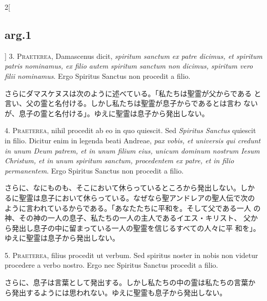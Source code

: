 \documentclass[paper=a4paper,fontsize=10pt,jafontsize=9pt,titlepage]{jlreq}
\begin{document}
\begin{paracol}{2}[\subsection{arg.1}]
3. {\scshape Praeterea}, Damascenus dicit, {\itshape spiritum sanctum ex patre dicimus, et
spiritum patris nominamus, ex filio autem spiritum sanctum non
dicimus, spiritum vero filii nominamus}. Ergo Spiritus
Sanctus non procedit a filio.

\switchcolumn

さらにダマスケヌスは次のように述べている。「私たちは聖霊が父からである
 と言い、父の霊と名付ける。しかし私たちは聖霊が息子からであるとは言わ
 ないが、息子の霊と名付ける」。ゆえに聖霊は息子から発出しない。


4. {\scshape Praeterea}, nihil procedit ab eo in quo quiescit. Sed {\itshape
Spiritus Sanctus} quiescit in filio. Dicitur enim in legenda beati
Andreae, {\itshape pax vobis, et universis qui credunt in unum Deum patrem, et
in unum filium eius, unicum dominum nostrum Iesum Christum, et in unum
spiritum sanctum, procedentem ex patre, et in filio permanentem}. Ergo
Spiritus Sanctus non procedit a filio.

\switchcolumn

さらに、なにものも、そこにおいて休らっているところから発出しない。しか
るに聖霊は息子において休らっている。なぜなら聖アンドレアの聖人伝で次の
 ように言われているからである。「あなたたちに平和を。そして父である一人
 の神、その神の一人の息子、私たちの一人の主人であるイエス・キリスト、
 父から発出し息子の中に留まっている一人の聖霊を信じるすべての人々に平
 和を」。ゆえに聖霊は息子から発出しない。


5. {\scshape Praeterea}, filius procedit ut verbum. Sed spiritus noster in nobis non
videtur procedere a verbo nostro. Ergo nec Spiritus Sanctus
procedit a filio.

\switchcolumn

さらに、息子は言葉として発出する。しかし私たちの中の霊は私たちの言葉か
 ら発出するようには思われない。ゆえに聖霊も息子から発出しない。



\end{paracol}
\end{document}
